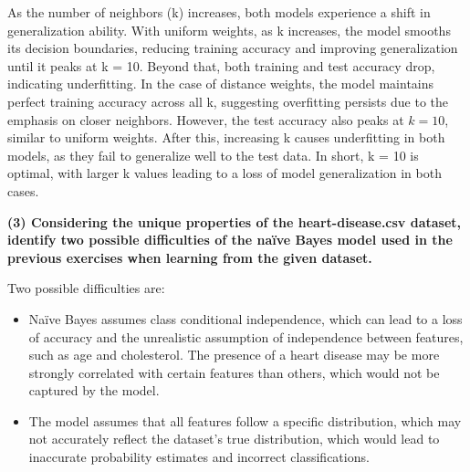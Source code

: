 \documentclass[12pt]{article}
\begin{document}
    \vspace{10pt}
    As the number of neighbors (k) increases, both models experience a shift in generalization ability. With uniform weights, as k increases, the model smooths its decision boundaries, reducing training accuracy and improving generalization until it peaks at k = 10. Beyond that, both training and test accuracy drop, indicating underfitting.
    In the case of distance weights, the model maintains perfect training accuracy across all k, suggesting overfitting persists due to the emphasis on closer neighbors. However, the test accuracy also peaks at $k = 10$, similar to uniform weights. After this, increasing k causes underfitting in both models, as they fail to generalize well to the test data. In short, k = 10 is optimal, with larger k values leading to a loss of model generalization in both cases.


    \vspace{20pt}
    \textbf{(3) Considering the unique properties of the heart-disease.csv dataset, identify two
    possible diﬃculties of the naïve Bayes model used in the previous exercises when learning
    from the given dataset.}

    \vspace{10pt}
    Two possible difficulties are:

    \begin{itemize}
        \item Naïve Bayes assumes class conditional independence, which can lead to a loss of accuracy and the unrealistic assumption of independence between features, such as age and cholesterol. The presence of a heart disease may be more strongly correlated with certain features than others, which would not be captured by the model.
        \item The model assumes that all features follow a specific distribution, which may not accurately reflect the dataset's true distribution, which would lead to inaccurate probability estimates and incorrect classifications.
    \end{itemize}
\end{document}
